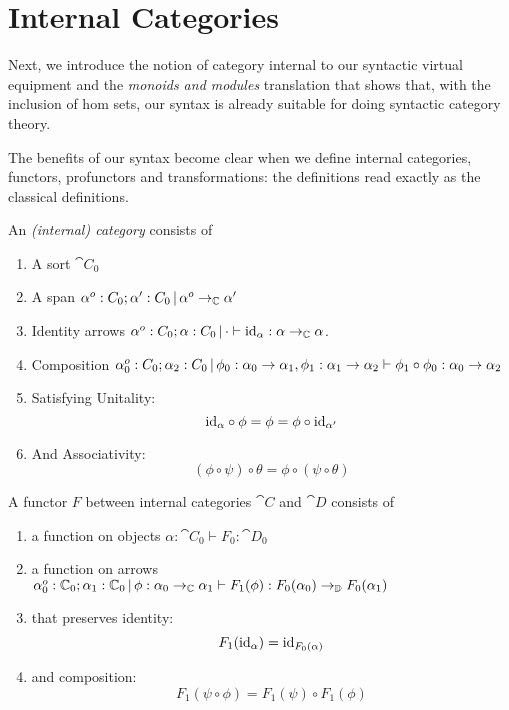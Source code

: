 \documentclass{article}
\begin{document}
\section{Internal Categories}

Next, we introduce the notion of category internal to our syntactic
virtual equipment and the \emph{monoids and modules} translation that
shows that, with the inclusion of hom sets, our syntax is already
suitable for doing syntactic category theory.

The benefits of our syntax become clear when we define internal
categories, functors, profunctors and transformations: the definitions
read exactly as the classical definitions.
\begin{definition}
  An \emph{(internal) category} consists of
  \begin{enumerate}
  \item A sort $\cat C_0$
  \item A span $\alpha^o:C_0;\alpha' : C_0 \,|\, \alpha^o \to_{\mathbb C} \alpha'$
  \item Identity arrows $\alpha^o : C_0; \alpha : C_0 \,|\, \cdot
    \vdash \text{id}_{\alpha} : \alpha \to_{\mathbb C} \alpha$.
  \item Composition $\alpha_0^o:C_0;\alpha_2:C_0\,|\, \phi_0 :
    \alpha_0 \to \alpha_1, \phi_1 : \alpha_1 \to \alpha_2 \vdash
    \phi_1 \circ \phi_0 : \alpha_0 \to \alpha_2$
  \item Satisfying Unitality:
    \[ \text{id}_{\alpha} \circ \phi = \phi = \phi \circ \text{id}_{\alpha'}\]
  \item And Associativity:
    \[ (\phi \circ \psi) \circ \theta = \phi \circ (\psi \circ \theta) \]
  \end{enumerate}
\end{definition}

\begin{definition}
  A functor $F$ between internal categories $\cat C$ and $\cat D$ consists of
  \begin{enumerate}
  \item a function on objects $\alpha : \cat C_0 \vdash F_0 : \cat D_0$
  \item a function on arrows $\alpha_0^o : \mathbb C_0; \alpha_1 : \mathbb C_0\,|\, \phi:\alpha_0 \to_{\mathbb C} \alpha_1 \vdash F_1(\phi) : F_0(\alpha_0) \to_{\mathbb D} F_0(\alpha_1)$
  \item that preserves identity:
    \[ F_1(\text{id}_{\alpha}) = \text{id}_{F_0(\alpha)}\]
  \item and composition:
    \[ F_1(\psi \circ \phi) = F_1(\psi) \circ F_1(\phi) \]
  \end{enumerate}
\end{definition}
\end{document}
